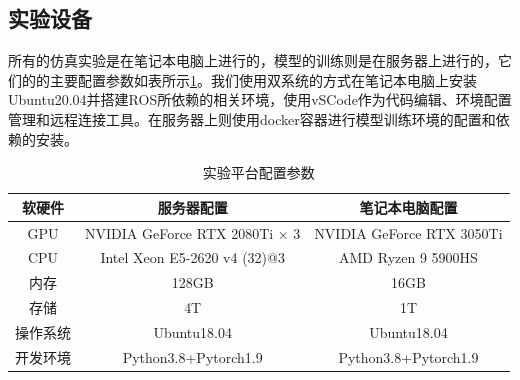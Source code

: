 \subsection{实验设备}
所有的仿真实验是在笔记本电脑上进行的，模型的训练则是在服务器上进行的，它们的的主要配置参数如表所示\ref{platformconfig}。我们使用双系统的方式在笔记本电脑上安装Ubuntu20.04并搭建ROS所依赖的相关环境，使用vSCode作为代码编辑、环境配置管理和远程连接工具。在服务器上则使用docker容器进行模型训练环境的配置和依赖的安装。
\begin{table}
    \caption{\label{platformconfig}实验平台配置参数}
    \centering
    \small
    \begin{tabular}{ccc}
        \hline
        软硬件 & 服务器配置 & 笔记本电脑配置 \tabularnewline 
        \hline 
        GPU & NVIDIA GeForce RTX 2080Ti × 3 & NVIDIA GeForce RTX 3050Ti \tabularnewline
        CPU & Intel Xeon E5-2620 v4 (32)@3 & AMD Ryzen 9 5900HS \tabularnewline
        内存 & 128GB & 16GB \tabularnewline
        存储 & 4T & 1T \tabularnewline
        操作系统 & Ubuntu18.04 & Ubuntu18.04 \tabularnewline
        开发环境 & Python3.8+Pytorch1.9 & Python3.8+Pytorch1.9 \tabularnewline
        \hline 
    \end{tabular}
\end{table}








